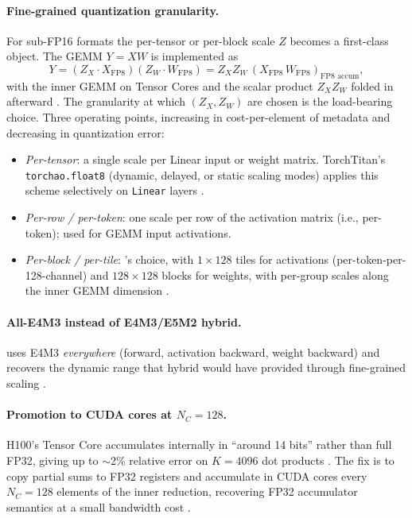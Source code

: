 \paragraph{Fine-grained quantization granularity.} For sub-FP16
formats the per-tensor or per-block scale $Z$ becomes a first-class
object. The  GEMM $Y = X W$ is implemented as
\begin{equation}
Y = (Z_X \cdot X_{\text{FP8}}) (Z_W \cdot W_{\text{FP8}})
  = Z_X Z_W \, (X_{\text{FP8}} \, W_{\text{FP8}})_{\text{FP8 accum}},
\label{eq:fp8-gemm}
\end{equation}
with the inner GEMM on  Tensor Cores and the scalar product
$Z_X Z_W$ folded in afterward \citep[\S 3.3.2, eq.\ 2]{deepseek-v3}.
The granularity at which $(Z_X, Z_W)$ are chosen is the load-bearing
choice. Three operating points, increasing in cost-per-element of
metadata and decreasing in quantization error:
\begin{itemize}
\item \emph{Per-tensor}: a single scale per Linear input or weight
matrix. TorchTitan's \texttt{torchao.float8} (dynamic, delayed, or
static scaling modes) applies this scheme selectively on
\texttt{Linear} layers \citep[\S 2.2.4]{torchtitan2024}.
\item \emph{Per-row / per-token}: one scale per row of the activation
matrix (i.e., per-token); used for GEMM input activations.
\item \emph{Per-block / per-tile}: 's choice, with $1
\times 128$ tiles for activations (per-token-per-128-channel) and $128
\times 128$ blocks for weights, with per-group scales along the inner
GEMM dimension \citep[\S 3.3.2]{deepseek-v3}.
\end{itemize}

\paragraph{All-E4M3 instead of E4M3/E5M2 hybrid.}  uses
E4M3 \emph{everywhere} (forward, activation backward, weight backward)
and recovers the dynamic range that hybrid would have provided through
fine-grained scaling \citep[\S 3.3.2]{deepseek-v3}.

\paragraph{Promotion to CUDA cores at $N_C = 128$.} H100's  Tensor
Core accumulates internally in ``around 14 bits'' rather than full
FP32, giving up to $\sim$2\% relative error on $K = 4096$ dot products
\citep[\S 3.3.2]{deepseek-v3}. The fix is to copy partial sums to
FP32 registers and accumulate in CUDA cores every $N_C = 128$
elements of the inner reduction, recovering FP32 accumulator semantics
at a small bandwidth cost \citep[\S 3.3.2]{deepseek-v3}.

